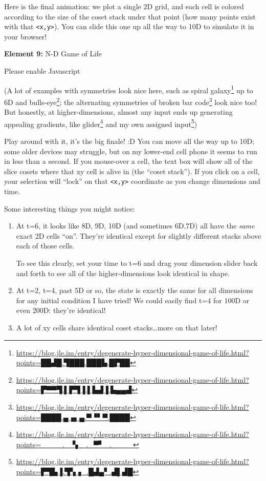 \documentclass[]{article}
\renewcommand{\href}[2]{#2\footnote{\url{#1}}}
\begin{document}
Here is the final animation: we plot a single 2D grid, and each cell is colored
according to the size of the coset stack under that point (how many points exist
with that \texttt{\textless{}x,y\textgreater{}}). You can slide this one up all
the way to 10D to simulate it in your browser!

\leavevmode\hypertarget{golFlat}{}%
\textbf{Element 9:} N-D Game of Life

\leavevmode\hypertarget{golFlatCont}{}%
Please enable Javascript

(A lot of examples with symmetries look nice here, such as
\href{https://blog.jle.im/entry/degenerate-hyper-dimensional-game-of-life.html?points=██▟█.▜███.███▙.█▛██}{spiral
galaxy} up to 6D and
\href{https://blog.jle.im/entry/degenerate-hyper-dimensional-game-of-life.html?points=▛▀▀▜.▌▛▜▐.▌▙▟▐.▙▄▄▟}{bulls-eye};
the alternating symmetries of
\href{https://blog.jle.im/entry/degenerate-hyper-dimensional-game-of-life.html?points=████.▄▗▖▄.▀▝▘▀.████}{broken
bar code} look nice too! But honestly, at higher-dimensions, almost any input
ends up generating appealing gradients, like
\href{https://blog.jle.im/entry/degenerate-hyper-dimensional-game-of-life.html?points=____._▝▖_._▀▘_.____}{glider}
and
\href{https://blog.jle.im/entry/degenerate-hyper-dimensional-game-of-life.html?points=▛▜▙▐.▜▚▗_.█▟▄▘.▟▌▟█}{my
own assigned input})

Play around with it, it's the big finale! :D You can move all the way up to 10D;
some older devices may struggle, but on my lower-end cell phone it seems to run
in less than a second. If you mouse-over a cell, the text box will show all of
the slice cosets where that xy cell is alive in (the ``coset stack''). If you
click on a cell, your selection will ``lock'' on that
\texttt{\textless{}x,y\textgreater{}} coordinate as you change dimensions and
time.

Some interesting things you might notice:

\begin{enumerate}
\def\labelenumi{\arabic{enumi}.}
\item
  At t=6, it looks like 8D, 9D, 10D (and sometimes 6D,7D) all have the
  \emph{same} exact 2D cells ``on''. They're identical except for slightly
  different stacks above each of those cells.

  To see this clearly, set your time to t=6 and drag your dimension slider back
  and forth to see all of the higher-dimensions look identical in shape.
\item
  At t=2, t=4, past 5D or so, the state is exactly the same for all dimensions
  for any initial condition I have tried! We could easily find t=4 for 100D or
  even 200D: they're identical!
\item
  A lot of xy cells share identical coset stacks\ldots more on that later!
\end{enumerate}
\end{document}
